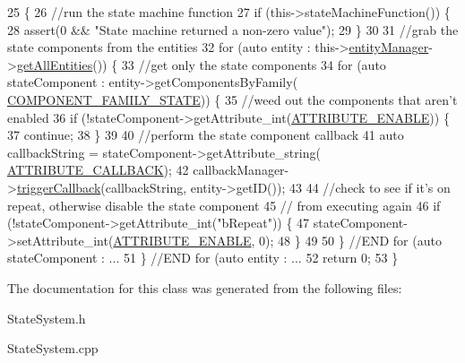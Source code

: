 \begin{DoxyCode}
25                          \{
26     \textcolor{comment}{//run the state machine function}
27     \textcolor{keywordflow}{if} (this->stateMachineFunction()) \{
28         assert(0 && \textcolor{stringliteral}{"State machine returned a non-zero value"});
29     \}
30 
31     \textcolor{comment}{//grab the state components from the entities}
32     \textcolor{keywordflow}{for} (\textcolor{keyword}{auto} entity : this->\hyperlink{class_abstract_system_ac0d16e94f5cea4b1a6bf489d35d7a14d}{entityManager}->\hyperlink{class_entity_manager_a452113e422a9c501bb008761f7609e33}{getAllEntities}()) \{
33         \textcolor{comment}{//get only the state components}
34         \textcolor{keywordflow}{for} (\textcolor{keyword}{auto} stateComponent : entity->getComponentsByFamily(
      \hyperlink{_state_component_8h_aac90c254d3963717ccf0661a124a0d20}{COMPONENT\_FAMILY\_STATE})) \{
35             \textcolor{comment}{//weed out the components that aren't enabled}
36             \textcolor{keywordflow}{if} (!stateComponent->getAttribute\_int(\hyperlink{_a_e___attributes_8h_a4c775095baf8a9c99621ad9ad3b622db}{ATTRIBUTE\_ENABLE})) \{
37                 \textcolor{keywordflow}{continue};
38             \}
39 
40             \textcolor{comment}{//perform the state component callback}
41             \textcolor{keyword}{auto} callbackString = stateComponent->getAttribute\_string(
      \hyperlink{_a_e___attributes_8h_a8602d00b356bb7e6ba95069a94fd5555}{ATTRIBUTE\_CALLBACK});
42             callbackManager->\hyperlink{class_callback_manager_a4c5dc4430f0fb5cebe240be020a8fbe9}{triggerCallback}(callbackString, entity->getID());
43 
44             \textcolor{comment}{//check to see if it's on repeat, otherwise disable the state component}
45             \textcolor{comment}{// from executing again}
46             \textcolor{keywordflow}{if} (!stateComponent->getAttribute\_int(\textcolor{stringliteral}{"bRepeat"})) \{
47                 stateComponent->setAttribute\_int(\hyperlink{_a_e___attributes_8h_a4c775095baf8a9c99621ad9ad3b622db}{ATTRIBUTE\_ENABLE}, 0);
48             \}
49 
50         \} \textcolor{comment}{//END for (auto stateComponent : ...}
51     \} \textcolor{comment}{//END for (auto entity : ...}
52     \textcolor{keywordflow}{return} 0;
53 \}\end{DoxyCode}


The documentation for this class was generated from the following files\-:\begin{DoxyCompactItemize}
\item 
State\-System.\-h\item 
State\-System.\-cpp\end{DoxyCompactItemize}
